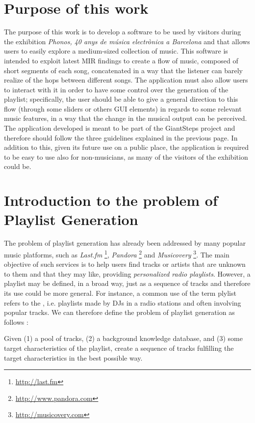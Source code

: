 \section{Purpose of this work}
The purpose of this work is to develop a software to be used by visitors during the exhibition \textit{Phonos, 40 anys de música electrònica a Barcelona} and that allows users to easily explore a medium-sized collection of music. This software is intended to exploit latest MIR findings to create a flow of music, composed of short segments of each song, concatenated in a way that the listener can barely realize of the hops between different songs. The application must also allow users to interact with it in order to have some control over the generation of the playlist; specifically, the user should be able to give a general direction to this flow (through some sliders or others GUI elements) in regards to some relevant music features, in a way that the change in the musical output can be perceived. The application developed is meant to be part of the GiantSteps project and therefore should follow the three guidelines explained in the previous page. In addition to this, given its future use on a public place, the application is required to be easy to use also for non-musicians, as many of the visitors of the exhibition could be.

\section{Introduction to the problem of Playlist Generation}
The problem of playlist generation has already been addressed by many popular music platforms, such as \textit{Last.fm} \footnote{\url{http://last.fm}}, \textit{Pandora} \footnote{\url{http://www.pandora.com}} and \textit{Musicovery} \footnote{\url{http://musicovery.com}}. The main objective of such services is to help users find tracks or artists that are unknown to them and that they may like, providing \textit{personalized radio playlists}. However, a playlist may be defined, in a broad way, just as a sequence of tracks \cite{bonnin14} and therefore its use could be more general. For instance, a common use of the term plylist refers to the , i.e. playlists made by DJs in a radio stations and often involving popular tracks. We can therefore define the problem of playlist generation as follows \cite{bonnin14}:

\begin{displayquote}
Given (1) a pool of tracks, (2) a background knowledge database, and (3) some target characteristics of the playlist, create a sequence of tracks fulfilling the target characteristics in the best possible way.
\end{displayquote}

